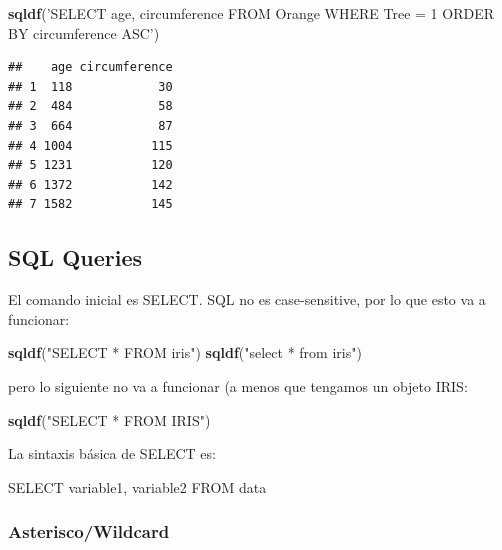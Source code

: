 \documentclass[
]{book}
\newenvironment{Shaded}{\begin{snugshade}}{\end{snugshade}}
\newcommand{\KeywordTok}[1]{\textcolor[rgb]{0.13,0.29,0.53}{\textbf{#1}}}
\newcommand{\NormalTok}[1]{#1}
\newcommand{\StringTok}[1]{\textcolor[rgb]{0.31,0.60,0.02}{#1}}
\begin{document}
\begin{Shaded}
\begin{Highlighting}[]
\KeywordTok{sqldf}\NormalTok{(}\StringTok{'SELECT age, circumference FROM Orange WHERE Tree = 1 ORDER BY circumference ASC'}\NormalTok{)}
\end{Highlighting}
\end{Shaded}

\begin{verbatim}
##    age circumference
## 1  118            30
## 2  484            58
## 3  664            87
## 4 1004           115
## 5 1231           120
## 6 1372           142
## 7 1582           145
\end{verbatim}

\hypertarget{sql-queries}{%
\subsection{SQL Queries}\label{sql-queries}}

El comando inicial es SELECT. SQL no es case-sensitive, por lo que esto va a funcionar:

\begin{Shaded}
\begin{Highlighting}[]
\KeywordTok{sqldf}\NormalTok{(}\StringTok{"SELECT * FROM iris"}\NormalTok{)}
\KeywordTok{sqldf}\NormalTok{(}\StringTok{"select * from iris"}\NormalTok{)}
\end{Highlighting}
\end{Shaded}

pero lo siguiente no va a funcionar (a menos que tengamos un objeto IRIS:

\begin{Shaded}
\begin{Highlighting}[]
\KeywordTok{sqldf}\NormalTok{(}\StringTok{"SELECT * FROM IRIS"}\NormalTok{)}
\end{Highlighting}
\end{Shaded}

La sintaxis básica de SELECT es:

\begin{Shaded}
\begin{Highlighting}[]
\NormalTok{SELECT variable1, variable2 FROM data}
\end{Highlighting}
\end{Shaded}

\hypertarget{asteriscowildcard}{%
\subsubsection{Asterisco/Wildcard}\label{asteriscowildcard}}
\end{document}
